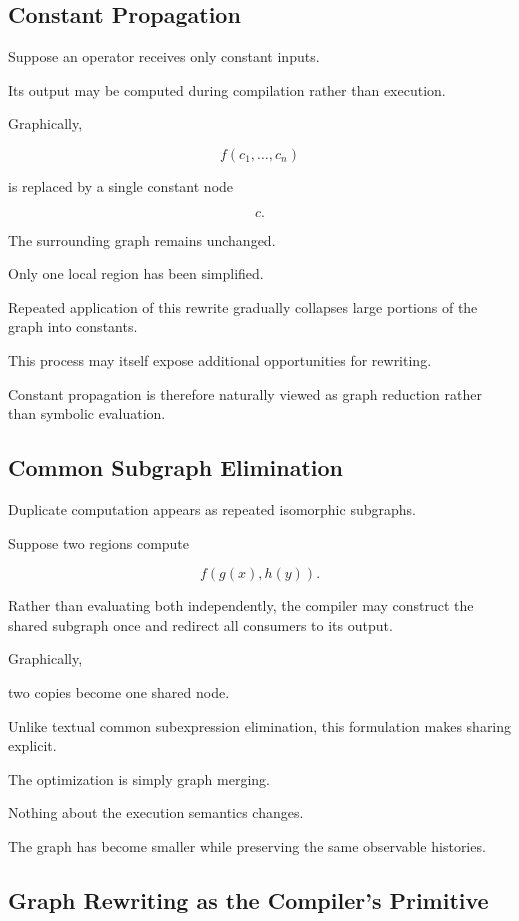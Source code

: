 \documentclass[12pt,oneside]{article}
\begin{document}
\subsection{Constant Propagation}

Suppose an operator receives only constant inputs.

Its output may be computed during compilation rather than execution.

Graphically,

\[
f(c_1,\ldots,c_n)
\]

is replaced by a single constant node

\[
c.
\]

The surrounding graph remains unchanged.

Only one local region has been simplified.

Repeated application of this rewrite gradually collapses large portions of the graph into constants.

This process may itself expose additional opportunities for rewriting.

Constant propagation is therefore naturally viewed as graph reduction rather than symbolic evaluation.

\subsection{Common Subgraph Elimination}

Duplicate computation appears as repeated isomorphic subgraphs.

Suppose two regions compute

\[
f(g(x),h(y)).
\]

Rather than evaluating both independently, the compiler may construct the shared subgraph once and redirect all consumers to its output.

Graphically,

two copies become one shared node.

Unlike textual common subexpression elimination, this formulation makes sharing explicit.

The optimization is simply graph merging.

Nothing about the execution semantics changes.

The graph has become smaller while preserving the same observable histories.

\subsection{Graph Rewriting as the Compiler's Primitive}
\end{document}
